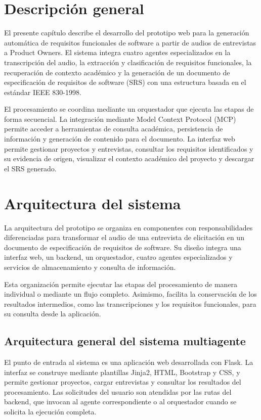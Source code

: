 \section{Descripción general}

El presente capítulo describe el desarrollo del prototipo web para la
generación automática de requisitos funcionales de software a partir
de audios de entrevistas a Product Owners. El sistema integra cuatro
agentes especializados en la transcripción del audio, la extracción
y clasificación de requisitos funcionales, la recuperación de contexto
académico y la generación de un documento de especificación de
requisitos de software (SRS) con una estructura basada en el estándar
IEEE 830-1998.

El procesamiento se coordina mediante un orquestador que ejecuta las
etapas de forma secuencial. La integración mediante Model Context
Protocol (MCP) permite acceder a herramientas de consulta académica,
persistencia de información y generación de contenido para el
documento. La interfaz web permite gestionar proyectos y entrevistas,
consultar los requisitos identificados y su evidencia de origen,
visualizar el contexto académico del proyecto y descargar el SRS
generado.


\section{Arquitectura del sistema}

La arquitectura del prototipo se organiza en componentes con
responsabilidades diferenciadas para transformar el audio de una
entrevista de elicitación en un documento de especificación de
requisitos de software. Su diseño integra una interfaz web, un
backend, un orquestador, cuatro agentes especializados y servicios
de almacenamiento y consulta de información.

Esta organización permite ejecutar las etapas del procesamiento
de manera individual o mediante un flujo completo. Asimismo,
facilita la conservación de los resultados intermedios, como
las transcripciones y los requisitos funcionales, para su consulta
desde la aplicación.

\subsection{Arquitectura general del sistema multiagente}

El punto de entrada al sistema es una aplicación web desarrollada
con Flask. La interfaz se construye mediante plantillas Jinja2,
HTML, Bootstrap y CSS, y permite gestionar proyectos, cargar
entrevistas y consultar los resultados del procesamiento.
Las solicitudes del usuario son atendidas por las rutas del
backend, que invocan al agente correspondiente o al orquestador
cuando se solicita la ejecución completa.


